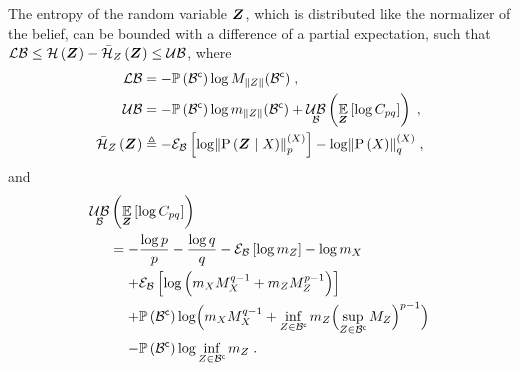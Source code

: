 \begin{propositionE}
	\label{thm:normalizer_bounds}
	The entropy of the random variable $\boldsymbol Z_{}$, which is distributed like the normalizer of the belief, can be bounded with a difference of a partial expectation, such that $\operatorname*{\mathcal{LB}}\leq\mathcal{H}\left({\boldsymbol Z_{}}\right) -\bar{\mathcal{H}}_{Z_{}}\left({\boldsymbol Z_{}}\right)\leq\operatorname*{\mathcal{UB}}$, where
	\begin{subequations}
		\begin{align}
			\lowerbound & =-\measure{\stcomp{\subSpace}}\log M_{\norm{\observations{}}}(\stcomp{\subSpace})\;,                                                                      \\
			\upperbound & =-\measure{\stcomp{\subSpace}}\log m_{\norm{\observations{}}}(\stcomp{\subSpace})+\upperbound_\subSpace\left(\expectation{\log C_{pq}}{\observationsRV{}}\right)\;,\\
			\simplentropy{\observationsRV{}}{\observations{}}&\triangleq-\partialexpectation{\log\pnorm{\probcond{\observationsRV{}}{\states{}}}{p}{\states{}}}{\subSpace}-\log\pnorm{\prob{\states{}}}{q}{\states{}}\;,
		\end{align}
	\end{subequations}
	and
	\begin{equation}
		\begin{split}
			\upperbound_\subSpace&\left(\expectation{\log C_{pq}}{\observationsRV{}}\right)                                                                                                                                                       \\
			&=-\frac{\log p}{p}-\frac{\log q}{q}-\partialexpectation{\log m_{\observations{}}}{\subSpace}-\log m_{\states{}}                                                                                                      \\
			&\phantomeq+ \partialexpectation{\log\left(m_{\states{}}M_{\states{}}^{q-1}+m_{\observations{}}M_{\observations{}}^{p-1}\right)}{\subSpace}                                                                           \\
			&\phantomeq+\measure{\stcomp{\subSpace}}\log\Bigl( m_{\states{}}M_{\states{}}^{q-1}+\inf_{\observations{}\in\stcomp{\subSpace}}m_{\observations{}}\Bigl(\sup_{\observations{}\in\stcomp{\subSpace}}M_{\observations{}}\Bigr)^{p-1}\Bigr) \\
			&\phantomeq-\measure{\stcomp{\subSpace}}\log\inf_{\observations{}\in\stcomp{\subSpace}}m_{\observations{}}\;.
		\end{split}
	\end{equation}
\end{propositionE}
